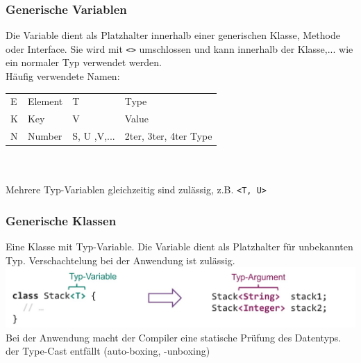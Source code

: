 \subsubsection{Generische Variablen}
Die Variable dient als Platzhalter innerhalb einer generischen Klasse, Methode oder Interface. Sie wird mit \verb|<>| umschlossen 
und kann innerhalb der Klasse,... wie ein normaler Typ verwendet werden.\\
Häufig verwendete Namen:\\
\begin{tabular}{l l|l l}\hline
    E & Element & T & Type\\
    K & Key     & V & Value\\
    N & Number  & S, U ,V,... & 2ter, 3ter, 4ter Type \\\hline
\end{tabular}\\
\\
Mehrere Typ-Variablen gleichzeitig sind zulässig, z.B. \verb|<T, U>|

\subsubsection{Generische Klassen}
Eine Klasse mit Typ-Variable. Die Variable dient als Platzhalter für unbekannten Typ. Verschachtelung bei der Anwendung ist zulässig.\\
\includegraphics[width=\linewidth]{pictures/generic-class.jpg}\\
Bei der Anwendung macht der Compiler eine statische Prüfung des Datentyps. der Type-Cast entfällt (auto-boxing, -unboxing)


